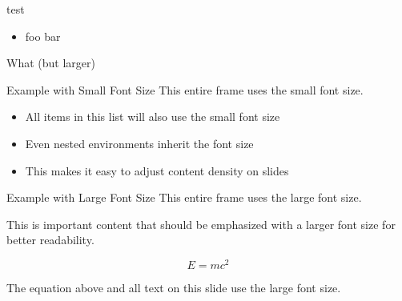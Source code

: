 \documentclass[11pt,compress,t,notes=noshow, xcolor=table]{beamer}
\begin{document}
\begin{frame}{test}
  \begin{itemize}
    \item foo bar
  \end{itemize}
  \begin{itemizeM}[Large]
    \item What (but larger)
  \end{itemizeM}
\end{frame}

\begin{frame2}[small]{Example with Small Font Size}
  This entire frame uses the small font size.
  
  \begin{itemize}
    \item All items in this list will also use the small font size
    \item Even nested environments inherit the font size
    \item This makes it easy to adjust content density on slides
  \end{itemize}
\end{frame2}

\begin{frame2}[LARGE]{Example with Large Font Size}
  This entire frame uses the large font size.
  
  \begin{center}
    This is important content that should be emphasized
    with a larger font size for better readability.
  \end{center}
  
  \begin{equation}
    E = mc^2
  \end{equation}
  
  The equation above and all text on this slide use the large font size.
\end{frame2}

\endlecture
\end{document}
